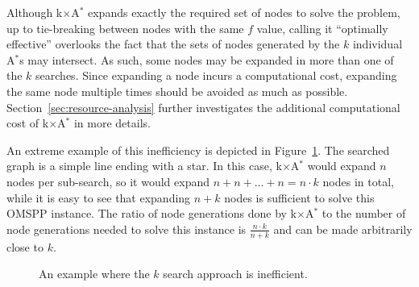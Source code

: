 \documentclass[smallextended]{svjour3}       %
\newcommand{\omspp}{\ac{OMSPP}\xspace}
\newcommand{\astar}{A$^*$\xspace}
\newcommand{\kxastar}{k$\times$A$^*$\xspace}
\newcommand{\roni}[1]{\textbf{[RS:#1]}}
\begin{document}

Although \kxastar expands exactly the required set of nodes to solve the problem, up to tie-breaking between nodes with the same $f$ value, calling it ``optimally effective'' overlooks the fact that the sets of nodes generated by the $k$ individual \astar{}s may intersect.
As such, some nodes may be expanded in more than one of the $k$ searches.
Since expanding a node incurs a computational cost, expanding the same node multiple times should be avoided as much as possible. 
Section~\ref{sec:resource-analysis} further investigates the additional computational cost of \kxastar in more details. 
 
An extreme example of this inefficiency is depicted in Figure~\ref{fig:k-search-bad}.
The searched graph is a simple line ending with a star. %
In this case, \kxastar would expand $n$ nodes per sub-search, so it would expand $n + n + \dots + n = n\cdot k$ nodes in total, while it is easy to see that expanding $n + k$ nodes is sufficient to solve this \omspp instance. 
The ratio of node generations done by \kxastar to the number of node generations needed to solve this instance is $\frac{n\cdot k}{n + k}$ and can be made arbitrarily close to $k$.
\begin{figure}
  \centering
  \caption{An example where the $k$ search approach is inefficient.}
  \label{fig:k-search-bad}
\end{figure}
\end{document}
